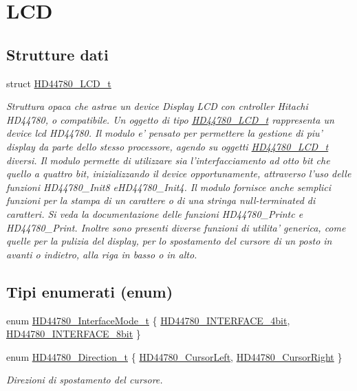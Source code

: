 \hypertarget{group___l_c_d}{\section{L\+C\+D}
\label{group___l_c_d}
}
\subsection*{Strutture dati}
\begin{DoxyCompactItemize}
\item 
struct \hyperlink{struct_h_d44780___l_c_d__t}{H\+D44780\+\_\+\+L\+C\+D\+\_\+t}
\begin{DoxyCompactList}\small\item\em Struttura opaca che astrae un device Display L\+C\+D con cntroller Hitachi H\+D44780, o compatibile. Un oggetto di tipo \hyperlink{struct_h_d44780___l_c_d__t}{H\+D44780\+\_\+\+L\+C\+D\+\_\+t} rappresenta un device lcd H\+D44780. Il modulo e' pensato per permettere la gestione di piu' display da parte dello stesso processore, agendo su oggetti \hyperlink{struct_h_d44780___l_c_d__t}{H\+D44780\+\_\+\+L\+C\+D\+\_\+t} diversi. Il modulo permette di utilizzare sia l'interfacciamento ad otto bit che quello a quattro bit, inizializzando il device opportunamente, attraverso l'uso delle funzioni H\+D44780\+\_\+\+Init8 e\+H\+D44780\+\_\+\+Init4. Il modulo fornisce anche semplici funzioni per la stampa di un carattere o di una stringa null-\/terminated di caratteri. Si veda la documentazione delle funzioni H\+D44780\+\_\+\+Printc e H\+D44780\+\_\+\+Print. Inoltre sono presenti diverse funzioni di utilita' generica, come quelle per la pulizia del display, per lo spostamento del cursore di un posto in avanti o indietro, alla riga in basso o in alto. \end{DoxyCompactList}\end{DoxyCompactItemize}
\subsection*{Tipi enumerati (enum)}
\begin{DoxyCompactItemize}
\item 
enum \hyperlink{group___l_c_d_gaaaea8b73e24f7658da4118f6b01b45f0}{H\+D44780\+\_\+\+Interface\+Mode\+\_\+t} \{ \hyperlink{group___l_c_d_ggaaaea8b73e24f7658da4118f6b01b45f0a45bf6ce7ec7c951f692bdce9f0f485c6}{H\+D44780\+\_\+\+I\+N\+T\+E\+R\+F\+A\+C\+E\+\_\+4bit}, 
\hyperlink{group___l_c_d_ggaaaea8b73e24f7658da4118f6b01b45f0a24da9b234f9358c14184fe21f3c47de5}{H\+D44780\+\_\+\+I\+N\+T\+E\+R\+F\+A\+C\+E\+\_\+8bit}
 \}
\item 
enum \hyperlink{group___l_c_d_gaf46f4db4f981d3a1088804a6d6980d30}{H\+D44780\+\_\+\+Direction\+\_\+t} \{ \hyperlink{group___l_c_d_ggaf46f4db4f981d3a1088804a6d6980d30aa4d704398d4edd1e0dec8dbb55f90292}{H\+D44780\+\_\+\+Cursor\+Left}, 
\hyperlink{group___l_c_d_ggaf46f4db4f981d3a1088804a6d6980d30a26006ced693b6bab28c6e30bfdb8c399}{H\+D44780\+\_\+\+Cursor\+Right}
 \}
\begin{DoxyCompactList}\small\item\em Direzioni di spostamento del cursore. \end{DoxyCompactList}\end{DoxyCompactItemize}
